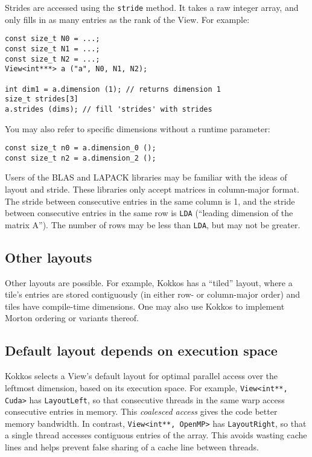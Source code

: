 Strides are accessed using the \lstinline!stride! method.  It takes a raw
integer array, and only fills in as many entries as the rank of the View.
For example:
\begin{lstlisting}
const size_t N0 = ...;
const size_t N1 = ...;
const size_t N2 = ...;
View<int***> a ("a", N0, N1, N2);

int dim1 = a.dimension (1); // returns dimension 1
size_t strides[3]
a.strides (dims); // fill 'strides' with strides
\end{lstlisting}
You may also refer to specific dimensions without a runtime parameter:
\begin{lstlisting}
const size_t n0 = a.dimension_0 ();
const size_t n2 = a.dimension_2 ();
\end{lstlisting}

Users of the BLAS and LAPACK libraries may be familiar with the ideas
of layout and stride.  These libraries only accept matrices in
column-major format.  The stride between consecutive entries in the
same column is 1, and the stride between consecutive entries in the
same row is \lstinline!LDA! (``leading dimension of the matrix A'').  The
number of rows may be less than \lstinline!LDA!, but may not be greater.

\subsection{Other layouts}\label{SS:View::Layout::Other}

Other layouts are possible.  For example, Kokkos has a ``tiled''
layout, where a tile's entries are stored contiguously (in either row-
or column-major order) and tiles have compile-time dimensions.  One
may also use Kokkos to implement Morton ordering or variants thereof.

\subsection{Default layout depends on execution space}\label{SS:View:Layout:Default}

Kokkos selects a View's default layout for optimal parallel access
over the leftmost dimension, based on its execution space.  For
example, \lstinline!View<int**, Cuda>! has \lstinline!LayoutLeft!, so that
consecutive threads in the same warp access consecutive entries in
memory.  This \emph{coalesced access} gives the code better memory
bandwidth.  In contrast, \lstinline!View<int**, OpenMP>! has
\lstinline!LayoutRight!, so that a single thread accesses contiguous
entries of the array.  This avoids wasting cache lines and helps
prevent false sharing of a cache line between threads.

